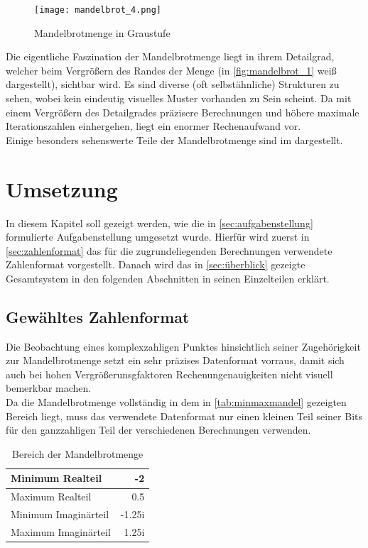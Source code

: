 \documentclass[a4paper,12pt,onesided]{report}
\begin{document}
\begin{figure}[H]
	\centering
	\texttt{[image: mandelbrot\_4.png]}
	\caption{Mandelbrotmenge in Graustufe}
	\label{fig:mandelbrot_1}
\end{figure}

Die eigentliche Faszination der Mandelbrotmenge liegt in ihrem Detailgrad, welcher beim Vergrößern des Randes der Menge (in \autoref{fig:mandelbrot_1} weiß dargestellt), sichtbar wird. Es sind diverse (oft selbstähnliche) Strukturen zu sehen, wobei kein eindeutig visuelles Muster vorhanden zu Sein scheint. Da mit einem Vergrößern des Detailgrades präzisere Berechnungen und höhere maximale Iterationszahlen einhergehen, liegt ein enormer Rechenaufwand vor.\\
Einige besonders sehenswerte Teile der Mandelbrotmenge sind im %
dargestellt.

\chapter{Umsetzung} %
In diesem Kapitel soll gezeigt werden, wie die in \autoref{sec:aufgabenstellung} formulierte Aufgabenstellung umgesetzt wurde. Hierfür wird zuerst in \autoref{sec:zahlenformat} das für die zugrundeliegenden Berechnungen verwendete Zahlenformat vorgestellt. Danach wird das in \autoref{sec:überblick} gezeigte Gesamtsystem in den folgenden Abschnitten in seinen Einzelteilen erklärt.

\section{Gewähltes Zahlenformat}
\label{sec:zahlenformat}
Die Beobachtung eines komplexzahligen Punktes hinsichtlich seiner Zugehörigkeit zur Mandelbrotmenge setzt ein sehr präzises Datenformat vorraus, damit sich auch bei hohen Vergrößerunsgfaktoren Rechenungenauigkeiten nicht visuell bemerkbar machen.\\
Da die Mandelbrotmenge vollständig in dem in \autoref{tab:minmaxmandel} gezeigten Bereich liegt, muss das verwendete Datenformat nur einen kleinen Teil seiner Bits für den ganzzahligen Teil der verschiedenen Berechnungen verwenden. \\

\begin{table}[H]
	\centering
	\begin{tabular}{|l|r|}	
		\hline
		Minimum Realteil & -2 \\ \hline
		Maximum Realteil & 0.5 \\ \hline
		Minimum Imaginärteil & -1.25i \\ \hline
		Maximum Imaginärteil & 1.25i \\ \hline
	\end{tabular}
	\caption{Bereich der Mandelbrotmenge}
	\label{tab:minmaxmandel}
\end{table}
\end{document}

